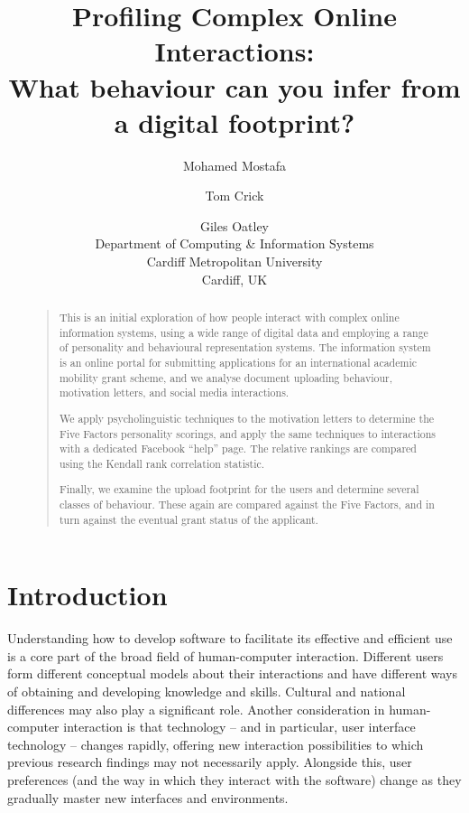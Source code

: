 \documentclass[letterpaper]{article}
\begin{document}
\title{Profiling Complex Online Interactions:\\What behaviour can you infer from a digital footprint?}
\author{Mohamed Mostafa \and Tom Crick \and Giles Oatley\\
Department of Computing \& Information Systems\\
Cardiff Metropolitan University\\
Cardiff, UK
}

\maketitle

\begin{abstract}
\begin{quote}
This is an initial exploration of how people interact with complex
online information systems, using a wide range of digital data and
employing a range of personality and behavioural representation
systems. The information system is an online portal for submitting
applications for an international academic mobility grant scheme, and
we analyse document uploading behaviour, motivation letters, and
social media interactions.

We apply psycholinguistic techniques to the motivation letters to
determine the Five Factors personality scorings, and apply the same
techniques to interactions with a dedicated Facebook ``help''
page. The relative rankings are compared using the Kendall rank
correlation statistic.

Finally, we examine the upload footprint for the users and determine
several classes of behaviour. These again are compared against the
Five Factors, and in turn against the eventual grant status of the
applicant.
\end{quote}
\end{abstract}


\section{Introduction}

Understanding how to develop software to facilitate its effective and
efficient use is a core part of the broad field of human-computer
interaction. Different users form different conceptual models about
their interactions and have different ways of obtaining and developing
knowledge and skills. Cultural and national differences may also play
a significant role. Another consideration in human-computer
interaction is that technology -- and in particular, user interface
technology -- changes rapidly, offering new interaction possibilities
to which previous research findings may not necessarily
apply. Alongside this, user preferences (and the way in which they
interact with the software) change as they gradually master new
interfaces and environments.
\end{document}

